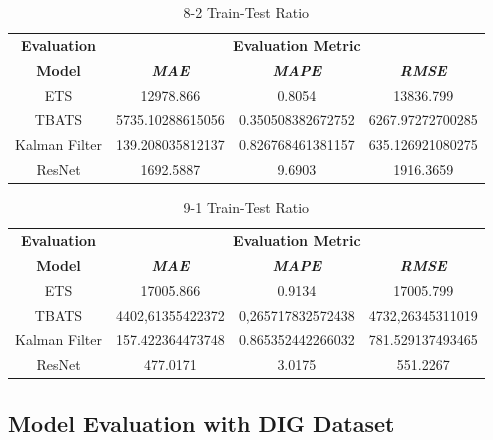 \documentclass[conference]{IEEEtran}
\begin{document}
\begin{table}[htbp]
\caption{8-2 Train-Test Ratio}
\begin{center}
\begin{tabular}{|c|c|c|c|}
\hline
\textbf{Evaluation}&\multicolumn{3}{|c|}{\textbf{Evaluation Metric}} \\
\cline{2-4} 
\textbf{Model} & \textbf{\textit{MAE}}& \textbf{\textit{MAPE}}& \textbf{\textit{RMSE}} \\
\hline
ETS & 12978.866 & 0.8054 & 13836.799\\
\hline
TBATS & 5735.10288615056 & 0.350508382672752 & 6267.97272700285\\
\hline
Kalman Filter & 139.208035812137 & 0.826768461381157 & 635.126921080275\\
\hline
ResNet & 1692.5887 & 9.6903 & 1916.3659\\
\hline
\end{tabular}
\label{tab1}
\end{center}
\end{table}

\begin{table}[htbp]
\caption{9-1 Train-Test Ratio}
\begin{center}
\begin{tabular}{|c|c|c|c|}
\hline
\textbf{Evaluation}&\multicolumn{3}{|c|}{\textbf{Evaluation Metric}} \\
\cline{2-4} 
\textbf{Model} & \textbf{\textit{MAE}}& \textbf{\textit{MAPE}}& \textbf{\textit{RMSE}} \\
\hline
ETS & 17005.866 & 0.9134 & 17005.799\\
\hline

TBATS & 4402,61355422372 & 0,265717832572438 & 4732,26345311019\\
\hline
Kalman Filter & 157.422364473748 & 0.865352442266032 & 781.529137493465\\
\hline
ResNet & 477.0171 & 3.0175 & 551.2267\\
\hline
\end{tabular}
\label{tab1}
\end{center}
\end{table}

\newpage

\subsection{Model Evaluation with DIG Dataset}
\end{document}
